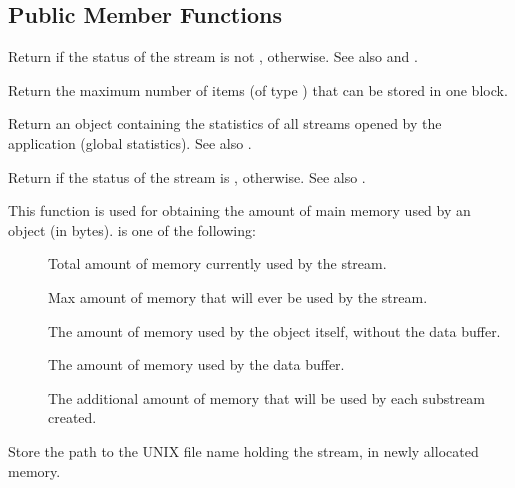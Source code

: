 \subsection{Public Member Functions}
  \btabb

     {Return  if the
    status of the stream is not
    ,  otherwise. See
    also  and .}

     {Return the maximum number
    of items (of type ) that can be stored in one block.}

    {Return an object containing the statistics of all streams opened by the
    application (global statistics). See also .}

     {Return  if the
    status of the stream is ,
     otherwise. See also .}

     {This function is used for obtaining the amount of main memory used by an
 object (in bytes).  is one of the
following:
\begin{description}
  \item[] Total amount of memory currently
used by the stream.
  \item[] Max amount of memory that will
ever be used by the stream.
  \item[] The amount of memory used by
the object itself, without the data buffer.
  \item[]  The amount of memory used by the
data buffer.
  \item[] The additional amount of
memory that will be used by  each substream created.
\end{description}
}

     {Store the path to the UNIX
file name holding the stream, in newly allocated memory.}

